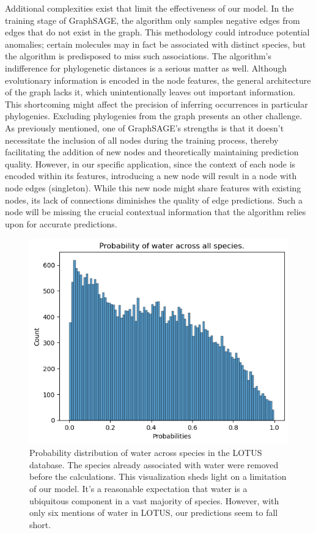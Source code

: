 \documentclass[
11pt, %
oneside, %
english, %
singlespacing, %
headsepline, %
chapterinoneline, %
]{MastersDoctoralThesis} %
\begin{document}
Additional complexities exist that limit the effectiveness of our model. In the training stage of GraphSAGE, the algorithm only samples negative edges from edges that do not exist in the graph. This methodology could introduce potential anomalies; certain molecules may in fact be associated with distinct species, but the algorithm is predisposed to miss such associations. The algorithm's indifference for phylogenetic distances is a serious matter as well. Although evolutionary information is encoded in the node features, the general architecture of the graph lacks it, which unintentionally leaves out important information. This shortcoming might affect the precision of inferring occurrences in particular phylogenies. Excluding phylogenies from the graph presents an other challenge. As previously mentioned, one of GraphSAGE's strengths is that it doesn't necessitate the inclusion of all nodes during the training process, thereby facilitating the addition of new nodes and theoretically maintaining prediction quality. However, in our specific application, since the context of each node is encoded within its features, introducing a new node will result in a node with node edges (singleton). While this new node might share features with existing nodes, its lack of connections diminishes the quality of edge predictions. Such a node will be missing the crucial contextual information that the algorithm relies upon for accurate predictions.

\begin{figure}[h]
	\centering
	\includegraphics[scale=0.7]{figure/water}
	\caption{Probability distribution of water across species in the LOTUS database. The species already associated with water were removed before the calculations. This visualization sheds light on a limitation of our model. It's a reasonable expectation that water is a ubiquitous component in a vast majority of species. However, with only six mentions of water in LOTUS, our predictions seem to fall short.}
	\label{fig: water probabilities}
\end{figure}
\end{document}
